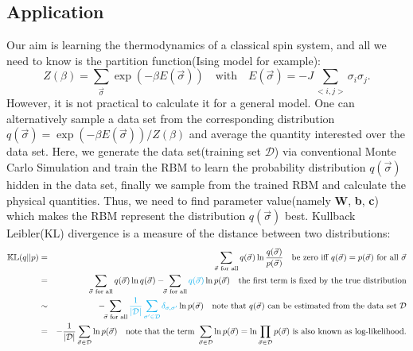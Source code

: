 \documentclass[letterpaper, 10pt]{article}
\begin{document}
\subsection{Application}
Our aim is learning the thermodynamics of a classical spin system, and all we need to know is the partition function(Ising model for example):
\begin{equation}
Z(\beta) = \sum_{\vec{\sigma}} \exp{( -\beta E(\vec{\sigma}) )} \quad{} \mathrm{with} \quad{} E(\vec{\sigma}) = -J \sum_{<i,j>} \sigma_i \sigma_j.
\end{equation}
However, it is not practical to calculate it for a general model.  One can alternatively sample a data set from the corresponding distribution $q(\vec{\sigma}) = \exp{( -\beta E(\vec{\sigma}) )} / Z(\beta)$ and average the quantity interested over the data set. Here, we generate the data set(training set $\mathcal{D}$) via conventional Monte Carlo Simulation and train the RBM to learn the probability distribution $q(\vec{\sigma})$ hidden in the data set, finally we sample from the trained RBM and calculate the physical quantities. Thus, we need to find parameter value(namely \textbf{W}, \textbf{b}, \textbf{c}) which makes the RBM represent the distribution $q(\vec{\sigma})$ best. Kullback Leibler(KL) divergence is a measure of the distance between two distributions:
\begin{eqnarray*}
\mathbb{KL}(q||p) & = & \sum_{\vec{\sigma}\,\,\textrm{for all}} q(\vec{\sigma}) \ln{ \frac{q(\vec{\sigma})}{p(\vec{\sigma})} } \quad{} \textrm{be zero iff } q(\vec{\sigma}) = p(\vec{\sigma}) \,\, \textrm{for all }\vec{\sigma}  \\
	& = & \sum_{\vec{\sigma}\,\,\textrm{for all}} q(\vec{\sigma}) \ln{q(\vec{\sigma})} - \!\!\sum_{\vec{\sigma}\,\,\textrm{for all}} {\color{cyan}{q(\vec{\sigma})}} \ln{p(\vec{\sigma})} \quad{} \textrm{the first term is fixed by the true distribution} \\
	& \sim & - \!\!\sum_{\vec{\sigma}\,\,\textrm{for all}} {\color{cyan}{\frac{1}{| \mathcal{D} |} \sum_{\sigma' \in \mathcal{D}} \delta_{\sigma,\sigma'}}} \ln{p(\vec{\sigma})} \quad{} \textrm{note that} \,\, q(\vec{\sigma}) \,\, \textrm{can be estimated from the data set $\mathcal{D}$} \\
	& = & - \frac{1}{|\mathcal{D}|} \sum_{\vec{\sigma} \in \mathcal{D}} \ln p(\vec{\sigma}) \quad{} \textrm{note that the term } \sum_{\vec{\sigma} \in \mathcal{D}} \ln p(\vec{\sigma}) = \ln \prod_{\vec{\sigma} \in \mathcal{D}} p(\vec{\sigma}) \,\, \textrm{is also known as log-likelihood.}
\end{eqnarray*}
\end{document}
